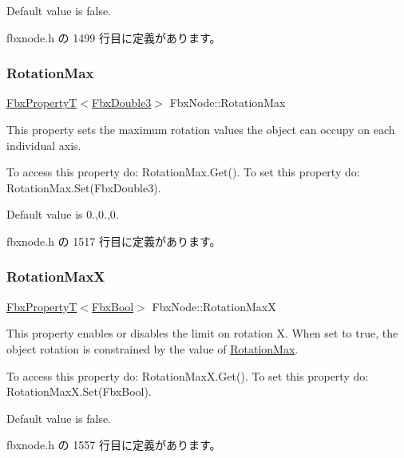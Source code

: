 Default value is false. 

 fbxnode.\+h の 1499 行目に定義があります。

\mbox{\label{class_fbx_node_a04c8e5651641fbfafaa2adb18be50696}} 
\subsubsection{\texorpdfstring{Rotation\+Max}{RotationMax}}
{\footnotesize\ttfamily \hyperlink{class_fbx_property_t}{Fbx\+PropertyT}$<$\hyperlink{fbxtypes_8h_ae0a96f14cde566774c7553aa7523b7a7}{Fbx\+Double3}$>$ Fbx\+Node\+::\+Rotation\+Max}

This property sets the maximum rotation values the object can occupy on each individual axis.

To access this property do\+: Rotation\+Max.\+Get(). To set this property do\+: Rotation\+Max.\+Set(\+Fbx\+Double3).

Default value is 0.,0.,0. 

 fbxnode.\+h の 1517 行目に定義があります。

\mbox{\label{class_fbx_node_a727d3f12af78c3ae37e77b5d87c97f79}} 
\subsubsection{\texorpdfstring{Rotation\+MaxX}{RotationMaxX}}
{\footnotesize\ttfamily \hyperlink{class_fbx_property_t}{Fbx\+PropertyT}$<$\hyperlink{fbxtypes_8h_a92e0562b2fe33e76a242f498b362262e}{Fbx\+Bool}$>$ Fbx\+Node\+::\+Rotation\+MaxX}

This property enables or disables the limit on rotation X. When set to {\ttfamily true}, the object rotation is constrained by the value of \hyperlink{class_fbx_node_a04c8e5651641fbfafaa2adb18be50696}{Rotation\+Max}.

To access this property do\+: Rotation\+Max\+X.\+Get(). To set this property do\+: Rotation\+Max\+X.\+Set(\+Fbx\+Bool).

Default value is false. 

 fbxnode.\+h の 1557 行目に定義があります。

\mbox{\label{class_fbx_node_a4182202837129c1e05f5dba5b37cb8c6}} 
